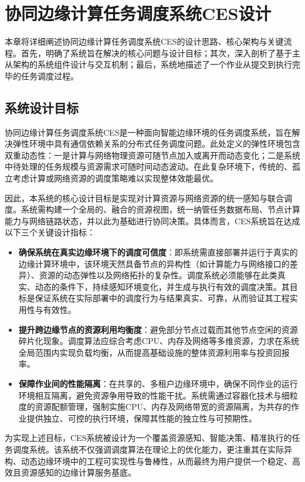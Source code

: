 \chapter{协同边缘计算任务调度系统CES设计}
本章将详细阐述协同边缘计算任务调度系统CES的设计思路、核心架构与关键流程。首先，明确了系统旨在解决的核心问题与设计目标；其次，深入剖析了基于主从架构的系统组件设计与交互机制；最后，系统地描述了一个作业从提交到执行完毕的任务调度过程。

\section{系统设计目标}
协同边缘计算任务调度系统CES是一种面向智能边缘环境的任务调度系统，旨在解决弹性环境中具有通信依赖关系的分布式任务调度问题。此处定义的弹性环境包含双重动态性：一是计算与网络物理资源可随节点加入或离开而动态变化；二是系统中待处理的任务规模与资源需求可随时间动态波动。在此复杂环境下，传统的、孤立考虑计算或网络资源的调度策略难以实现整体效能最优。

因此，本系统的核心设计目标是实现对计算资源与网络资源的统一感知与联合调度。系统需构建一个全局的、融合的资源视图，统一纳管任务数据布局、节点计算能力与网络链路状态，并以此为基础进行协同决策。具体而言，CES系统旨在达成以下三个关键设计指标：
\begin{itemize}
\item \textbf{确保系统在真实边缘环境下的调度可信度}：即系统需直接部署并运行于真实的边缘计算环境中，该环境天然具备节点的异构性（如计算能力与网络接口的差异）、资源的动态弹性以及网络拓扑的复杂性。调度系统必须能够在此类真实、动态的条件下，持续感知环境变化，并生成与执行有效的调度决策。其目标是保证系统在实际部署中的调度行为与结果真实、可靠，从而验证其工程实用性与有效性。

\item \textbf{提升跨边缘节点的资源利用均衡度}：避免部分节点过载而其他节点空闲的资源碎片化现象。调度算法应综合考虑CPU、内存及网络等多维资源，力求在系统全局范围内实现负载均衡，从而提高基础设施的整体资源利用率与投资回报率。

\item \textbf{保障作业间的性能隔离}：在共享的、多租户边缘环境中，确保不同作业的运行环境相互隔离，避免资源争用导致的性能干扰。系统需通过容器化技术与细粒度的资源配额管理，强制实施CPU、内存及网络带宽的资源隔离，为共存的作业提供独立、可控的执行环境，保障其性能的独立性与可预期性。
\end{itemize}

为实现上述目标，CES系统被设计为一个覆盖资源感知、智能决策、精准执行的任务调度系统。该系统不仅强调调度算法在理论上的优化能力，更注重其在实际异构、动态边缘环境中的工程可实现性与鲁棒性，从而最终为用户提供一个稳定、高效且资源感知的边缘计算服务基底。

